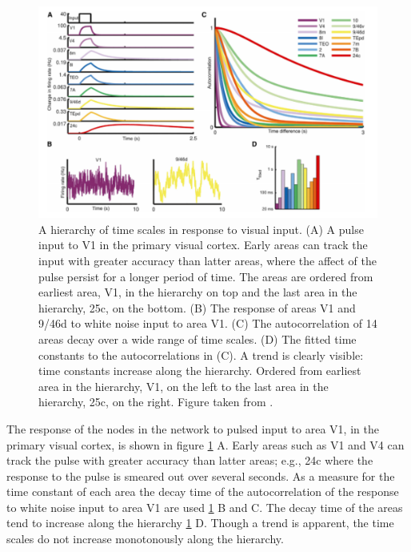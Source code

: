 \begin{figure}[!ht]
\centering
\includegraphics[scale=0.3]{wang_figures/mainfig}
\caption{A hierarchy of time scales in response to visual input.
(A) A pulse input to V1 in the primary visual cortex. Early areas can track the input with greater accuracy than latter areas, where the affect of the pulse persist for a longer period of time. The areas are ordered from earliest area, V1, in the hierarchy on top and the last area in the hierarchy, 25c, on the bottom.
(B) The response of areas V1 and 9/46d to white noise input to area V1.
(C) The autocorrelation of 14 areas decay over a wide range of time scales.
(D) The fitted time constants to the autocorrelations in (C). A trend is clearly visible: time constants increase along the hierarchy. Ordered from earliest area in the hierarchy, V1, on the left to the last area in the hierarchy, 25c, on the right.
Figure taken from \cite{chaudhuri2015large-scale}.
}
\label{fig:wang_fig}
\end{figure}

The response of the nodes in the network to pulsed input to area V1, in the primary visual cortex, is shown in figure \ref{fig:wang_fig} A. Early areas such as V1 and V4 can track the pulse with greater accuracy than latter areas; e.g., 24c where the response to the pulse is smeared out over several seconds.
As a measure for the time constant of each area the decay time of the autocorrelation of the response to white noise input to area V1 are used \ref{fig:wang_fig} B and C.
The decay time of the areas tend to increase along the hierarchy \ref{fig:wang_fig} D.
Though a trend is apparent, the time scales do not increase monotonously along the hierarchy. 


